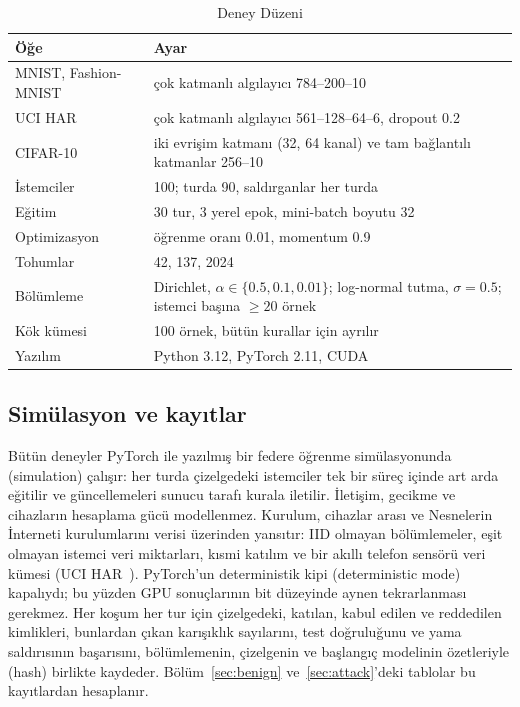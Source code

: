 \documentclass[journal]{IEEEtran}
\begin{document}
\begin{table}[!t]
\centering\footnotesize
\setlength{\tabcolsep}{4pt}
\caption{Deney Düzeni}\label{tab:setup}
\begin{tabular}{@{}lp{}@{}}
\toprule
Öğe & Ayar \\
\midrule
MNIST, Fashion-MNIST & çok katmanlı algılayıcı 784--200--10 \\
UCI HAR & çok katmanlı algılayıcı 561--128--64--6, dropout 0.2 \\
CIFAR-10 & iki evrişim katmanı (32, 64 kanal) ve tam bağlantılı katmanlar 256--10 \\
\addlinespace[2pt]
İstemciler & 100; turda 90, saldırganlar her turda \\
Eğitim & 30 tur, 3 yerel epok, mini-batch boyutu 32 \\
Optimizasyon & öğrenme oranı 0.01, momentum 0.9 \\
Tohumlar & 42, 137, 2024 \\
Bölümleme & Dirichlet, $\alpha\in\{0.5,0.1,0.01\}$; log-normal tutma, $\sigma=0.5$; istemci başına $\geq20$ örnek \\
Kök kümesi & 100 örnek, bütün kurallar için ayrılır \\
Yazılım & Python 3.12, PyTorch 2.11, CUDA \\
\bottomrule
\end{tabular}
\end{table}

\subsection{Simülasyon ve kayıtlar}
Bütün deneyler PyTorch ile yazılmış bir federe öğrenme simülasyonunda (simulation) çalışır: her turda çizelgedeki istemciler tek bir süreç içinde art arda eğitilir ve güncellemeleri sunucu tarafı kurala iletilir. İletişim, gecikme ve cihazların hesaplama gücü modellenmez. Kurulum, cihazlar arası ve Nesnelerin İnterneti kurulumlarını verisi üzerinden yansıtır: IID olmayan bölümlemeler, eşit olmayan istemci veri miktarları, kısmi katılım ve bir akıllı telefon sensörü veri kümesi (UCI HAR~\cite{anguita2013har}). PyTorch'un deterministik kipi (deterministic mode) kapalıydı; bu yüzden GPU sonuçlarının bit düzeyinde aynen tekrarlanması gerekmez. Her koşum her tur için çizelgedeki, katılan, kabul edilen ve reddedilen kimlikleri, bunlardan çıkan karışıklık sayılarını, test doğruluğunu ve yama saldırısının başarısını, bölümlemenin, çizelgenin ve başlangıç modelinin özetleriyle (hash) birlikte kaydeder. Bölüm~\ref{sec:benign} ve~\ref{sec:attack}'deki tablolar bu kayıtlardan hesaplanır.
\end{document}
